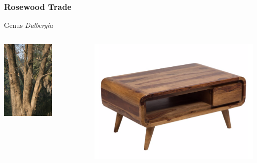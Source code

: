 \documentclass[10pt]{beamer}
\begin{document}
\begin{frame}[t]
\frametitle{Rosewood Trade}
\vspace{0.5cm}

	Genus \emph{Dalbergia}\\
	
	\vspace{0.5cm}
	
	\begin{columns}
		\begin{column}{0.5\textwidth}
			\begin{center}
				\includegraphics[width=0.6\textwidth]{figures/dalbergia.jpg}
			\end{center}
		\end{column}
		
		\begin{column}{0.5\textwidth}
			\begin{center}
				\includegraphics[width=1.0\textwidth]{figures/dalbergia2.png}
			\end{center}
		\end{column}
	\end{columns}
\end{frame}
\end{document}
